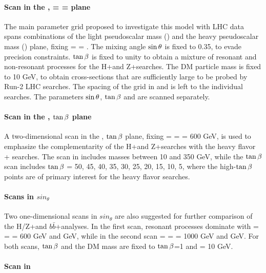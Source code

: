 \paragraph{Scan in the \ma, \mA = \mH = \mHc plane}

The main parameter grid proposed to investigate this model with LHC data spans combinations of the light pseudoscalar mass (\ma) and the heavy pseudoscalar mass (\mA) plane, fixing \mA = \mH = \mHc. The mixing angle $\sin\theta$ is fixed to 0.35, to evade precision constraints. $\tan\beta$ is fixed to unity to obtain a mixture of resonant and non-resonant processes for the H+\MET and Z+\MET searches. The DM particle mass is fixed to 10 GeV, to obtain cross-sections that are sufficiently large to be probed by Run-2 LHC searches. The spacing of the grid in \ma and \mA is left to the individual searches. The parameters $\sin\theta$, $\tan\beta$ and \mDM are scanned separately.

\paragraph{Scan in the \ma, $\tan\beta$ plane}

A two-dimensional scan in the \ma, $\tan\beta$ plane, fixing \mA = \mH = \mHc = 600 GeV, is used to emphasize the complementarity of the H+\MET and Z+\MET searches with the heavy flavor + \MET searches. The scan in \ma includes masses between 10 and 350 GeV, while the $\tan\beta$ scan includes $\tan\beta$ = 50, 45, 40, 35, 30, 25, 20, 15, 10, 5, where the high-$\tan\beta$ points are of primary interest for the heavy flavor searches. 

\paragraph{Scans in $sin_{\theta}$}

Two one-dimensional scans in $sin_{\theta}$ are also suggested for further comparison of the H/Z+\MET and $b\bar{b}$+\MET analyses. In the first scan, resonant processes dominate with \mA = \mH = \mHc = 600 GeV and  GeV, while in the second scan \mA = \mH = \mHc = 1000 GeV and  GeV. For both scans, $\tan\beta$ and the DM mass are fixed to $\tan\beta$=1 and \mDM = 10 GeV. 

\paragraph{Scan in \mDM}

